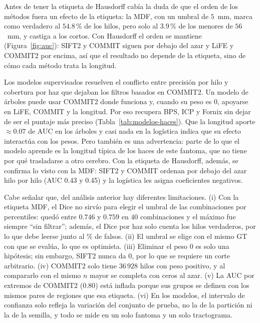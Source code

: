 \documentclass[11pt,a4paper]{article}
\begin{document}
Antes de tener la etiqueta de Hausdorff cab\'ia la duda de que el orden de los m\'etodos fuera un efecto de la etiqueta: la MDF, con un umbral de $5$~mm, marca como verdadero al $54.8$\,\% de los hilos, pero solo al $3.9$\,\% de los menores de $56$~mm, y castiga a los cortos. Con Hausdorff el orden se mantiene (Figura~\ref{fig:auc}): SIFT2 y COMMIT siguen por debajo del azar y LiFE y COMMIT2 por encima, as\'i que el resultado no depende de la etiqueta, sino de c\'omo cada m\'etodo trata la longitud.


Los modelos supervisados resuelven el conflicto entre precisi\'on por hilo y cobertura por
haz que dejaban los filtros basados en COMMIT2. Un modelo de \'arboles puede usar COMMIT2
donde funciona y, cuando su peso es 0, apoyarse en LiFE, COMMIT y la longitud. Por eso
recupera BPS, ICP y Fornix sin dejar de ser el puntaje m\'as preciso
(Tabla~\ref{tab:modelos-haces}). Que la longitud aporte $\approx0.07$ de AUC en los
\'arboles y casi nada en la log\'istica indica que su efecto interact\'ua con los pesos. Pero
tambi\'en es una advertencia: parte de lo que el modelo aprende es la longitud t\'ipica de
los haces de este fantoma, que no tiene por qu\'e trasladarse a otro cerebro. Con la
etiqueta de Hausdorff, adem\'as, se confirma lo visto con la MDF: SIFT2 y COMMIT ordenan por
debajo del azar hilo por hilo (AUC 0.43 y 0.45) y la log\'istica les asigna coeficientes
negativos.

Cabe señalar que, del análisis anterior hay diferentes limitaciones. (i) Con la etiqueta MDF, el Dice no sirv\'io para elegir el umbral de las combinaciones por percentiles: qued\'o entre $0.746$ y $0.759$ en $40$ combinaciones y el m\'aximo fue siempre ``sin filtrar''; adem\'as, el Dice por haz solo cuenta los hilos verdaderos, por lo que debe leerse junto al \% de falsos. (ii) El umbral se elige con el mismo GT con que se eval\'ua, lo que es optimista. (iii) Eliminar el peso $0$ es solo una hip\'otesis; sin embargo, SIFT2 nunca da $0$, por lo que se requiere un corte arbitrario. (iv) COMMIT2 solo tiene $36\,928$ hilos con peso positivo, y al compararlo con el mismo $n$ mayor se completa con ceros al azar. (v) La AUC por extremos de COMMIT2 ($0.80$) est\'a inflada porque sus grupos se definen con los mismos pares de regiones que esa etiqueta. (vi) En los modelos, el intervalo de confianza solo refleja la variaci\'on del conjunto de prueba, no la de la partici\'on ni la de la semilla, y todo se mide en un solo fantoma y un solo tractograma.
\end{document}
